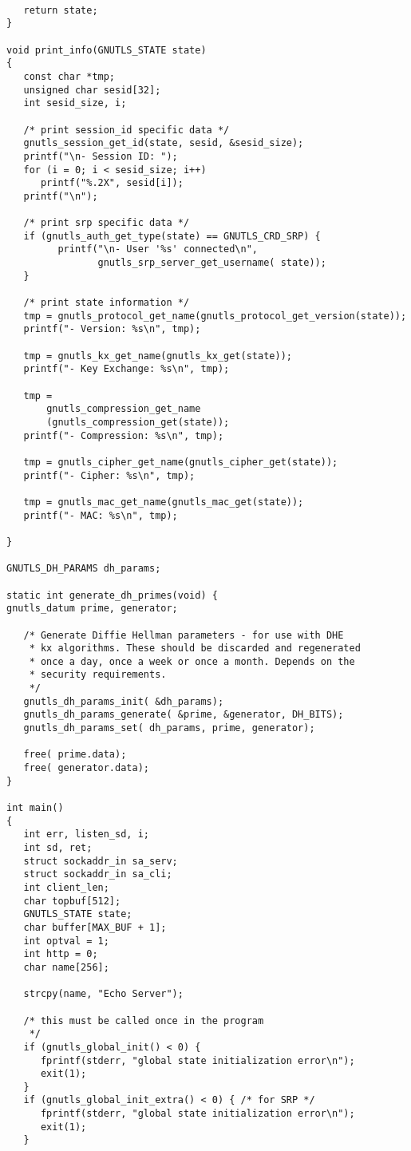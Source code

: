 \begin{verbatim}
   
   return state;
}

void print_info(GNUTLS_STATE state)
{
   const char *tmp;
   unsigned char sesid[32];
   int sesid_size, i;

   /* print session_id specific data */
   gnutls_session_get_id(state, sesid, &sesid_size);
   printf("\n- Session ID: ");
   for (i = 0; i < sesid_size; i++)
      printf("%.2X", sesid[i]);
   printf("\n");

   /* print srp specific data */
   if (gnutls_auth_get_type(state) == GNUTLS_CRD_SRP) {
         printf("\n- User '%s' connected\n",
                gnutls_srp_server_get_username( state));
   }

   /* print state information */
   tmp = gnutls_protocol_get_name(gnutls_protocol_get_version(state));
   printf("- Version: %s\n", tmp);

   tmp = gnutls_kx_get_name(gnutls_kx_get(state));
   printf("- Key Exchange: %s\n", tmp);

   tmp =
       gnutls_compression_get_name
       (gnutls_compression_get(state));
   printf("- Compression: %s\n", tmp);

   tmp = gnutls_cipher_get_name(gnutls_cipher_get(state));
   printf("- Cipher: %s\n", tmp);

   tmp = gnutls_mac_get_name(gnutls_mac_get(state));
   printf("- MAC: %s\n", tmp);

}

GNUTLS_DH_PARAMS dh_params;

static int generate_dh_primes(void) {
gnutls_datum prime, generator;

   /* Generate Diffie Hellman parameters - for use with DHE
    * kx algorithms. These should be discarded and regenerated
    * once a day, once a week or once a month. Depends on the
    * security requirements.
    */
   gnutls_dh_params_init( &dh_params);
   gnutls_dh_params_generate( &prime, &generator, DH_BITS);
   gnutls_dh_params_set( dh_params, prime, generator);

   free( prime.data);
   free( generator.data);
}

int main()
{
   int err, listen_sd, i;
   int sd, ret;
   struct sockaddr_in sa_serv;
   struct sockaddr_in sa_cli;
   int client_len;
   char topbuf[512];
   GNUTLS_STATE state;
   char buffer[MAX_BUF + 1];
   int optval = 1;
   int http = 0;
   char name[256];

   strcpy(name, "Echo Server");

   /* this must be called once in the program
    */
   if (gnutls_global_init() < 0) {
      fprintf(stderr, "global state initialization error\n");
      exit(1);
   }
   if (gnutls_global_init_extra() < 0) { /* for SRP */
      fprintf(stderr, "global state initialization error\n");
      exit(1);
   }


\end{verbatim}
